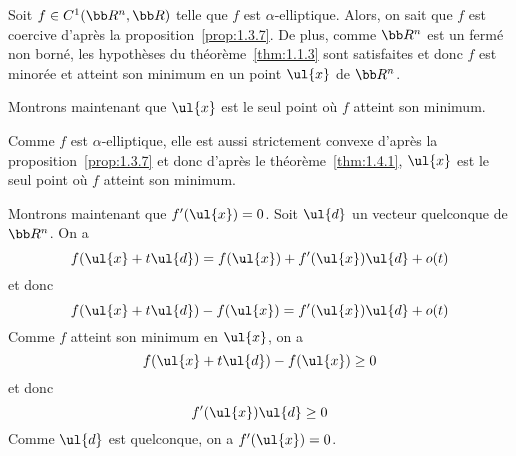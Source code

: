 

Soit \(f\in C^1(\bb R^n, \bb R)\) telle que \(f\) est \(\alpha\)-elliptique.
Alors, on sait que \(f\) est coercive d'après
la proposition~\ref{prop:1.3.7}. De plus, comme \(\bb R^n\) est un
fermé non borné, les hypothèses du théorème~\ref{thm:1.1.3} sont
satisfaites et donc \(f\) est minorée et atteint son minimum en un
point \(\ul{x}\) de \(\bb R^n\).

Montrons maintenant que \(\ul{x}\) est le seul point où \(f\) atteint
son minimum.

Comme \(f\) est \(\alpha\)-elliptique, elle est aussi strictement
convexe d'après la proposition~\ref{prop:1.3.7} et donc d'après le théorème~\ref{thm:1.4.1}, \(\ul{x}\) est
le seul point où \(f\) atteint son minimum.

Montrons maintenant que \(f'(\ul{x}) = 0\). Soit \(\ul{d}\) un vecteur
quelconque de \(\bb R^n\). On a
\begin{equation*}
    f(\ul{x} + t\ul{d}) = f(\ul{x}) + f'(\ul{x})\ul{d} + o(t)
\end{equation*}
et donc
\begin{equation*}
    f(\ul{x} + t\ul{d}) - f(\ul{x}) = f'(\ul{x})\ul{d} + o(t)
\end{equation*}
Comme \(f\) atteint son minimum en \(\ul{x}\), on a
\begin{equation*}
    f(\ul{x} + t\ul{d}) - f(\ul{x}) \geq 0
\end{equation*}
et donc
\begin{equation*}
    f'(\ul{x})\ul{d} \geq 0
\end{equation*}
Comme \(\ul{d}\) est quelconque, on a \(f'(\ul{x}) = 0\).
